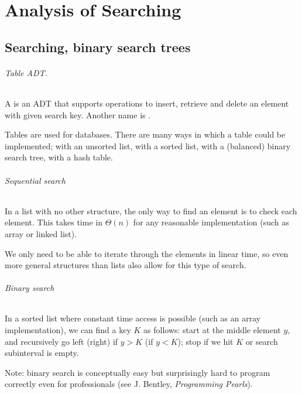 \part{Analysis of Searching}  
\label{ch:effsearch}

\chapter{Searching, binary search trees} %

\paragraph{Table ADT.}
\begin{Definition}
A  is an ADT that supports operations to insert, retrieve and delete an element
with given search key.  Another name is .
\end{Definition}
Tables are used for databases. There are  many ways in which a table could be implemented;
with an unsorted list, with a sorted list, with a (balanced) binary search tree, with a hash table.

\paragraph{Sequential search}

In a list with no other structure, the only way to find an element is to 
check each element. 
This takes time in $\Theta(n)$ for any reasonable implementation (such as 
array or linked list).

We only need to be able to iterate through the elements in linear time, so
 even more general structures than lists also allow for this type of search.


\paragraph{Binary search}

In a sorted list where constant time access is possible 
(such as an array implementation), we can find a key $K$ as follows: start at the middle element $y$, and recursively go left (right) if $y>K$ (if $y<K$);
 stop if we hit  $K$ or search subinterval is empty.

Note: binary search is conceptually easy but surprisingly hard to program
 correctly even for professionals (see J. Bentley, \emph{Programming Pearls}).

